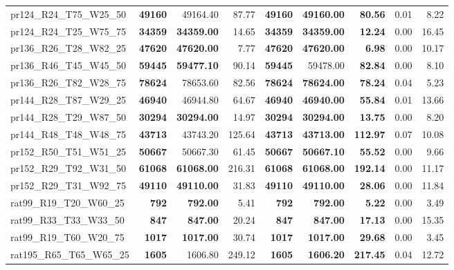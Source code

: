 \documentclass{singlecol-new}
\begin{document}
\begin{scriptsize}
\begin{longtable}{lrrrrrrrr}
		pr124\_R24\_T75\_W25\_50 & \textbf{49160} & 49164.40 & 87.77 & \textbf{49160} & \textbf{49160.00} & \textbf{80.56} & 0.01 & 8.22 \\
		pr124\_R24\_T25\_W75\_75 & \textbf{34359} & \textbf{34359.00} & 14.65 & \textbf{34359} & \textbf{34359.00} & \textbf{12.24} & 0.00 & 16.45 \\
		pr136\_R26\_T28\_W82\_25 & \textbf{47620} & \textbf{47620.00} & 7.77 & \textbf{47620} & \textbf{47620.00} & \textbf{6.98} & 0.00 & 10.17 \\
		pr136\_R46\_T45\_W45\_50 & \textbf{59445} & \textbf{59477.10} & 90.14 & \textbf{59445} & 59478.00 & \textbf{82.84} & 0.00 & 8.10 \\
		pr136\_R26\_T82\_W28\_75 & \textbf{78624} & 78653.60 & 82.56 & \textbf{78624} & \textbf{78624.00} & \textbf{78.24} & 0.04 & 5.23 \\
		pr144\_R28\_T87\_W29\_25 & \textbf{46940} & 46944.80 & 64.67 & \textbf{46940} & \textbf{46940.00} & \textbf{55.84} & 0.01 & 13.66 \\
		pr144\_R28\_T29\_W87\_50 & \textbf{30294} & \textbf{30294.00} & 14.97 & \textbf{30294} & \textbf{30294.00} & \textbf{13.75} & 0.00 & 8.20 \\
		pr144\_R48\_T48\_W48\_75 & \textbf{43713} & 43743.20 & 125.64 & \textbf{43713} & \textbf{43713.00} & \textbf{112.97} & 0.07 & 10.08 \\
		pr152\_R50\_T51\_W51\_25 & \textbf{50667} & 50667.30 & 61.45 & \textbf{50667} & \textbf{50667.10} & \textbf{55.52} & 0.00 & 9.66 \\
		pr152\_R29\_T92\_W31\_50 & \textbf{61068} & \textbf{61068.00} & 216.31 & \textbf{61068} & \textbf{61068.00} & \textbf{192.14} & 0.00 & 11.17 \\
		pr152\_R29\_T31\_W92\_75 & \textbf{49110} & \textbf{49110.00} & 31.83 & \textbf{49110} & \textbf{49110.00} & \textbf{28.06} & 0.00 & 11.84 \\
		rat99\_R19\_T20\_W60\_25 & \textbf{792} & \textbf{792.00} & 5.41 & \textbf{792} & \textbf{792.00} & \textbf{5.22} & 0.00 & 3.49 \\
		rat99\_R33\_T33\_W33\_50 & \textbf{847} & \textbf{847.00} & 20.24 & \textbf{847} & \textbf{847.00} & \textbf{17.13} & 0.00 & 15.35 \\
		rat99\_R19\_T60\_W20\_75 & \textbf{1017} & \textbf{1017.00} & 30.74 & \textbf{1017} & \textbf{1017.00} & \textbf{29.68} & 0.00 & 3.45 \\
		rat195\_R65\_T65\_W65\_25 & \textbf{1605} & 1606.80 & 249.12 & \textbf{1605} & \textbf{1606.20} & \textbf{217.45} & 0.04 & 12.72 \\

\end{longtable}
\end{scriptsize}
\end{document}
